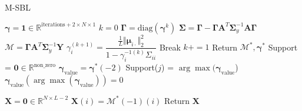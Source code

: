 \begin{algorithm}[H]
\caption{M-SBL}
\begin{algorithmic}[1]
\State $\boldsymbol{\gamma} = \mathbf{1} \in \mathbb{R}^{\text{iterations} + 2 \times N \times 1}$
\State $k = 0$
	\State $\boldsymbol{\Gamma} = \text{diag}(\boldsymbol{\gamma}^k)$
		\State $\boldsymbol{\Sigma} = \boldsymbol{\Gamma} - \boldsymbol{\Gamma} \mathbf{A}^T \boldsymbol{\Sigma}_y^{-1} \mathbf{A} \boldsymbol{\Gamma}$
		\State $\mathcal{M} = \boldsymbol{\Gamma} \mathbf{A}^T \boldsymbol{\Sigma}_y^{-1} \mathbf{Y}$
		\State $\gamma_i^{(k+1)} = \dfrac{\frac{1}{L} \Vert \boldsymbol{\mu}_{i \cdot} \Vert_2^2}{1 - \gamma_i^{-1 (k)} \Sigma_{ii}}$
	\EndFor
		\State Break
	\EndIf
	\State $k += 1$
\EndWhile
\State Return $\mathcal{M}^\ast, \boldsymbol{\gamma}^\ast$
\EndProcedure
{}
\State Support = $\mathbf{0} \in \mathbb{R}^{\text{non\_zero}}$
\State $\boldsymbol{\gamma}_{\text{value}} = \boldsymbol{\gamma}^\ast (-2)$
		\State Support($j$) = $\arg \max (\boldsymbol{\gamma}_{\text{value}}$)
		\State $\boldsymbol{\gamma}_{\text{value}}(\arg \max (\boldsymbol{\gamma}_{\text{value}})) = 0$
	\EndIf

\EndFor
\State $\mathbf{X} = \mathbf{0} \in \mathbb{R}^{N \times L-2}$
	\State $\mathbf{X}(i) = \mathcal{M}^\ast(-1)(i)$
\EndFor
\State Return $\mathbf{X}$
\EndProcedure
\end{algorithmic}
\end{algorithm}